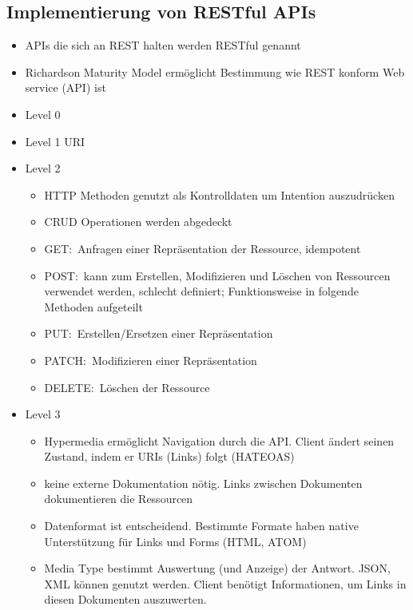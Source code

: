 \subsection{Implementierung von RESTful APIs}
\begin{itemize}
  \item APIs die sich an REST halten werden RESTful genannt
  \item Richardson Maturity Model ermöglicht Bestimmung wie REST konform Web service (API) ist
  \item Level 0
  \item Level 1
  URI
  \item Level 2
  \begin{itemize}
    \item HTTP Methoden genutzt als Kontrolldaten um Intention auszudrücken
    \item CRUD Operationen werden abgedeckt
    \item GET:\ Anfragen einer Repräsentation der Ressource, idempotent
    \item POST:\ kann zum Erstellen, Modifizieren und Löschen von Ressourcen verwendet werden, schlecht definiert; Funktionsweise in folgende Methoden aufgeteilt
    \item PUT:\ Erstellen/Ersetzen einer Repräsentation
    \item PATCH:\ Modifizieren einer Repräsentation
    \item DELETE:\ Löschen der Ressource
  \end{itemize}
  \item Level 3
  \begin{itemize}
    \item Hypermedia ermöglicht Navigation durch die API\@. Client ändert seinen Zustand, indem er URIs (Links) folgt (HATEOAS)
    \item keine externe Dokumentation nötig. Links zwischen Dokumenten dokumentieren die Ressourcen
    \item Datenformat ist entscheidend. Bestimmte Formate haben native Unterstützung für Links und Forms (HTML, ATOM)
    \item Media Type bestimmt Auswertung (und Anzeige) der Antwort. JSON, XML können genutzt werden. Client benötigt Informationen, um Links in diesen Dokumenten auszuwerten.
  \end{itemize}
\end{itemize}

